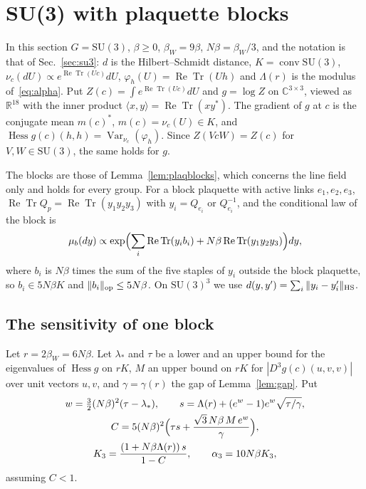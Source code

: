 \documentclass[aps,prd,twocolumn,superscriptaddress,nofootinbib,longbibliography,floatfix,amsmath,amssymb,10pt]{revtex4-2}
\theoremstyle{definition}
\theoremstyle{remark}
\newcommand{\R}{\mathbb{R}}
\newcommand{\C}{\mathbb{C}}
\newcommand{\SU}{\mathrm{SU}}
\newcommand{\ReTr}{\operatorname{Re}\operatorname{Tr}}
\newcommand{\Hess}{\operatorname{Hess}}
\newcommand{\Var}{\operatorname{Var}}
\newcommand{\ip}[2]{\langle #1,#2\rangle}
\begin{document}
\section{SU(3) with plaquette blocks}\label{sec:su3blocks}

In this section $G=\SU(3)$, $\beta\ge0$, $\beta_W=9\beta$, $N\beta=\beta_W/3$,
and the notation is that of Sec.~\ref{sec:su3}: $d$ is the Hilbert--Schmidt
distance, $K=\operatorname{conv}\SU(3)$, $\nu_c(dU)\propto e^{\ReTr(Uc)}dU$,
$\varphi_h(U)=\ReTr(Uh)$ and $\Lambda(r)$ is the modulus
of~\eqref{eq:alpha}. Put $Z(c)=\int e^{\ReTr(Uc)}dU$ and $g=\log Z$ on
$\C^{3\times3}$, viewed as $\R^{18}$ with the inner product $\ip
xy=\ReTr(xy^*)$. The gradient of $g$ at $c$ is the conjugate mean
$m(c)^*$, $m(c)=\nu_c(U)\in K$, and $\Hess g(c)(h,h)=\Var_{\nu_c}(\varphi_h)$.
Since $Z(VcW)=Z(c)$ for $V,W\in\SU(3)$, the same holds for $g$.

The blocks are those of Lemma~\ref{lem:plaqblocks}, which concerns the line
field only and holds for every group. For a block plaquette with active
links $e_1,e_2,e_3$, $\ReTr Q_p=\ReTr(y_1y_2y_3)$ with $y_i=Q_{e_i}$ or
$Q_{e_i}^{-1}$, and the conditional law of the block is
\begin{equation}\label{eq:blocklaw3}
\mu_b(dy)\propto\exp\Bigl(\sum_i\ReTr(y_ib_i)+N\beta\ReTr(y_1y_2y_3)
\Bigr)dy ,
\end{equation}
where $b_i$ is $N\beta$ times the sum of the five staples of $y_i$ outside
the block plaquette, so $b_i\in5N\beta K$ and $\|b_i\|_{\rm op}\le5N\beta$.
On $\SU(3)^3$ we use $d(y,y')=\sum_i\|y_i-y'_i\|_{\rm HS}$.

\subsection{The sensitivity of one block}

Let $r=2\beta_W=6N\beta$. Let $\lambda_*$ and $\tau$ be a lower and an upper
bound for the eigenvalues of $\Hess g$ on $rK$, $M$ an upper bound on $rK$
for $|D^3g(c)(u,v,v)|$ over unit vectors $u,v$, and $\gamma=\gamma(r)$ the
gap of Lemma~\ref{lem:gap}. Put
\begin{equation}\label{eq:blockconst3}
\begin{gathered}
w=\tfrac32(N\beta)^2(\tau-\lambda_*),\qquad s=\Lambda(r)+(e^w-1)e^w
\sqrt{\tau/\gamma},\\
C=5(N\beta)^2\Bigl(\tau s+\frac{\sqrt3\,N\beta\,M\,e^w}{\gamma}\Bigr),\\
K_3=\frac{(1+N\beta\Lambda(r))\,s}{1-C},\qquad\alpha_3=10N\beta K_3,
\end{gathered}
\end{equation}
assuming $C<1$.
\end{document}
